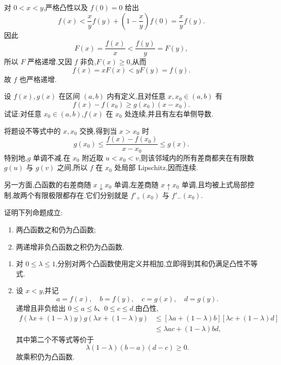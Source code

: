\begin{solution}
    对 $0<x<y$,严格凸性以及 $f(0)=0$ 给出
    \[
        f(x)
        <\dfrac{x}{y}f(y)+\left(1-\dfrac{x}{y}\right)f(0)
        =\dfrac{x}{y}f(y).
    \]
    因此
    \[
        F(x)=\dfrac{f(x)}{x}<\dfrac{f(y)}{y}=F(y),
    \]
    所以 $F$ 严格递增.又因 $f$ 非负,$F(x)\geq0$,从而
    \[
        f(x)=xF(x)<yF(y)=f(y).
    \]
    故 $f$ 也严格递增.
\end{solution}

\begin{example}
    设 $f(x),g(x)$ 在区间 $(a,b)$ 内有定义,且对任意 $x,x_0\in(a,b)$ 有
    \[
        f(x)-f(x_0)\geq g(x_0)(x-x_0).
    \]
    试证:对任意 $x_0\in(a,b)$,$f(x)$ 在 $x_0$ 处连续,并且有左右单侧导数.
\end{example}
\exampleblank

\begin{solution}
    将题设不等式中的 $x,x_0$ 交换,得到当 $x>x_0$ 时
    \[
        g(x_0)
        \leq\dfrac{f(x)-f(x_0)}{x-x_0}
        \leq g(x).
    \]
    特别地,$g$ 单调不减.在 $x_0$ 附近取 $u<x_0<v$,则该邻域内的所有差商都夹在有限数 $g(u)$ 与 $g(v)$ 之间,所以 $f$ 在 $x_0$ 处局部 Lipschitz,因而连续.

    另一方面,凸函数的右差商随 $x\downarrow x_0$ 单调,左差商随 $x\uparrow x_0$ 单调,且均被上式局部控制,故两个有限极限都存在.它们分别就是 $f'_+(x_0)$ 与 $f'_-(x_0)$.
\end{solution}

\begin{example}
    证明下列命题成立:
    \begin{enumerate}
        \item 两凸函数之和仍为凸函数;
        \item 两递增非负凸函数之积仍为凸函数.
    \end{enumerate}
\end{example}
\exampleblank

\begin{solution}
    \begin{enumerate}
        \item 对 $0\leq\lambda\leq1$,分别对两个凸函数使用定义并相加,立即得到其和仍满足凸性不等式.

        \item 设 $x<y$,并记
              \[
                  a=f(x),\quad b=f(y),\quad c=g(x),\quad d=g(y).
              \]
              递增且非负给出 $0\leq a\leq b$、$0\leq c\leq d$.由凸性,
              \[
                  \begin{aligned}
                      f(\lambda x+(1-\lambda)y)
                      g(\lambda x+(1-\lambda)y)
                       & \leq[\lambda a+(1-\lambda)b]
                      [\lambda c+(1-\lambda)d]         \\
                       & \leq\lambda ac+(1-\lambda)bd,
                  \end{aligned}
              \]
              其中第二个不等式等价于
              \[
                  \lambda(1-\lambda)(b-a)(d-c)\geq0.
              \]
              故乘积仍为凸函数.
    \end{enumerate}
\end{solution}

